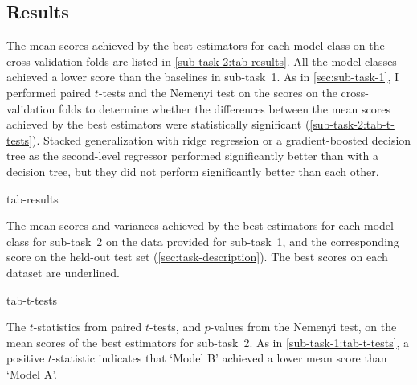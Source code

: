 \subsection{Results}
\label{sec:sub-task-2:results}

The mean scores achieved by the best estimators for each model class on the
cross-validation folds are listed in \cref{sub-task-2:tab-results}.
All the model classes achieved a lower score than the baselines in sub-task~1.
As in \cref{sec:sub-task-1}, I performed paired $t$-tests and the Nemenyi test on the
scores on the cross-validation folds to determine whether the differences between the
mean scores achieved by the best estimators were statistically significant
(\cref{sub-task-2:tab-t-tests}).
Stacked generalization with ridge regression or a gradient-boosted decision tree as the
second-level regressor performed significantly better than with a decision tree, but
they did not perform significantly better than each other.

\begin{table}
  \centering
  {tab-results}
  \caption{
    The mean scores and variances achieved by the best estimators for each model class
    for sub-task~2 on the data provided for sub-task~1, and the corresponding score on
    the held-out test set (\cref{sec:task-description}).
    The best scores on each dataset are underlined.
  }
  \label{sub-task-2:tab-results}
\end{table}

\begin{table}
  \centering
  {tab-t-tests}
  \caption{
    The $t$-statistics from paired $t$-tests, and $p$-values from the Nemenyi test, on
    the mean scores of the best estimators for sub-task~2.
    As in \cref{sub-task-1:tab-t-tests}, a positive $t$-statistic indicates that `Model B'
    achieved a lower mean score than `Model A'.
  }
  \label{sub-task-2:tab-t-tests}
\end{table}
